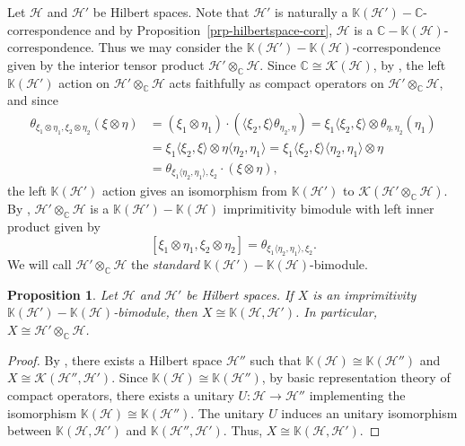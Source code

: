 \documentclass[11pt, letterpaper,final]{amsart}
\renewcommand{\H}{{\mathcal{H}}}
\newcommand{\K}{{\mathcal{K}}}
\newcommand{\bbK}{{\mathbb{K}}}
\newtheorem{prp}[thm]{Proposition}
\theoremstyle{definition}
\begin{document}
Let $\H$ and $\H'$ be Hilbert spaces.  Note that $\H'$ is naturally a $\bbK(\H')-\mathbb{C}$-correspondence and by Proposition~\ref{prp-hilbertspace-corr}, $\H$ is a $\mathbb{C}-\bbK(\H)$-correspondence.  Thus we may consider the $\bbK(\H')-\bbK(\H)$-correspondence given by the interior tensor product $\H' \otimes_\mathbb{C} \H$.  Since $\mathbb{C} \cong \K(\H)$, by \cite[Proposition~4.7]{Lan95}, the left $\bbK(\H')$ action on $\H' \otimes_\mathbb{C} \H$ acts faithfully as compact operators on $\H' \otimes_\mathbb{C} \H$, and since 
\begin{align*}
\theta_{\xi_1 \otimes \eta_1, \xi_2 \otimes \eta_2 } ( \xi \otimes \eta) &= ( \xi_1 \otimes \eta_1) \cdot ( \langle \xi_2, \xi \rangle \theta_{\eta_2, \eta}) = \xi_1 \langle \xi_2, \xi \rangle \otimes \theta_{\eta, \eta_2} ( \eta_1) \\
	&= \xi_1 \langle \xi_2, \xi \rangle \otimes \eta \langle \eta_2, \eta_1 \rangle = \xi_1 \langle \xi_2, \xi \rangle \langle \eta_2, \eta_1 \rangle \otimes \eta \\
	&= \theta_{ \xi_1 \langle \eta_2, \eta_1 \rangle, \xi_2 } \cdot ( \xi \otimes \eta),
\end{align*}
the left $\bbK(\H')$ action gives an isomorphism from $\bbK(\H')$ to $\K(\H' \otimes_\mathbb{C} \H)$.  By \cite[Proposition~3.8]{RW-Morita-Eq}, $\H' \otimes_\mathbb{C} \H$ is a $\bbK(\H')-\bbK(\H)$ imprimitivity bimodule with left inner product given by 
\[
[ \xi_1 \otimes \eta_1, \xi_2 \otimes \eta_2 ]  = \theta_{ \xi_1 \langle \eta_2, \eta_1 \rangle, \xi_2 }.
\]
We will call $\H' \otimes_\mathbb{C} \H$ the \emph{standard} $\bbK(\H') - \bbK(\H)$-bimodule.


\begin{prp}\label{pr:imprimitive-bimodule}
Let $\H$ and $\H'$ be Hilbert spaces.  If $X$ is an imprimitivity $\bbK(\H')-\bbK(\H)$-bimodule, then $X \cong \bbK(\H, \H')$.  In particular, $X \cong \H' \otimes_\mathbb{C} \H$.
\end{prp}

\begin{proof}
By \cite[Lemma~3]{Schweizer-PAMS1999}, there exists a Hilbert space $\H''$ such that $\bbK(\H) \cong \bbK(\H'')$ and $X \cong \K( \H'', \H')$.  Since $\bbK(\H) \cong \bbK(\H'')$, by basic representation theory of compact operators, there exists a unitary $U \colon \H \to \H''$ implementing the isomorphism $\bbK(\H) \cong \bbK(\H'')$.  The unitary $U$ induces an unitary isomorphism between $\bbK(\H, \H')$ and $\bbK(\H'', \H')$.  Thus, $X \cong \bbK(\H, \H')$.
\end{proof}
\end{document}
